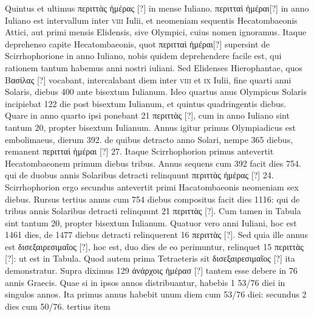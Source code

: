 Quintus et ultimus
\textgreek{περιττὰς ἡμέρας [?]} in mense Iuliano.
\textgreek{περιτταὶ ἡμέραι[?]} in anno Iuliano
est intervallum inter \textsc{viii} Iulii, et neomeniam sequentis Hecatombaeonis
Attici, aut primi mensis Elidensis, sive Olympici, cuius nomen
ignoramus.
Itaque deprehenso capite Hecatombaeonis, quot
\textgreek{περιτταὶ ἡμέραι[?]} supersint de Scirrhophorione in anno Iuliano,
 nobis quidem
deprehendere facile est, qui rationem tantum habemus anni nostri
iuliani.
Sed Elidenses Hierophantae, quos \textgreek{Βασίλας [?]} vocabant,
intercalabant
diem inter \textsc{viii} et \textsc{ix} Iulii, fine quarti anni Solaris, diebus
400 ante bisextum Iulianum.
Ideo quartus anus Olympicus Solaris
incipiebat 122 die post bisextum Iulianum, et quintus quadringentis
diebus.
Quare in anno quarto ipsi ponebant 21 \textgreek{περιττὰς [?]}, cum in
anno Iuliano sint tantum 20, propter bisextum Iulianum.
Annus igitur
primus Olympiadicus est embolimaeus, dierum 392. de quibus
detracto anno Solari, nempe 365 diebus, remanent
 \textgreek{περιτταὶ ἡμέραι [?]} 27.
Itaque Scirrhophorion primus antevertit Hecatombaeonem primum
diebus tribus.
Annus sequens cum 392 facit dies 754. qui de duobus
annis Solaribus detracti relinquunt \textgreek{περιττὰς ἡμέρας [?]} 24.
Scirrhophorion
ergo secundus antevertit primi Hacatombaeonis neomeniam sex diebus.
Rursus tertius annus cum 754 diebus compositus facit dies 1116: qui
de tribus annis Solaribus detracti relinquunt 21 \textgreek{περιττὰς [?]}.
Cum tamen in
Tabula sint tantum 20, propter bisextum Iulianum.
Quatuor vero anni
Iuliani, hoc est 1461 dies, de 1477 diebus detracti relinquerent 16
\textgreek{περιττὰς [?]}.
Sed quia ille annus est \textgreek{δισεξαιρεσιμαῖος [?]}, hoc est,
 duo dies de eo
perimuntur, relinquet 15 \textgreek{περιττὰς [?]}: ut est in Tabula.
Quod autem prima
Tetraeteris sit \textgreek{δισεξαιρεσιμαῖος [?]} ita demonstratur.
Supra diximus 129
\textgreek{ἀνάρχοις ἡμέρασ [?]} tantem esse debere in 76 annis Graecis.
Quae si in ipsos
annos distribuantur, habebis 1 53/76 diei in singulos annos.
Ita primus annus
habebit unum diem cum 53/76 diei: secundus 2 dies cum 50/76. tertius item
